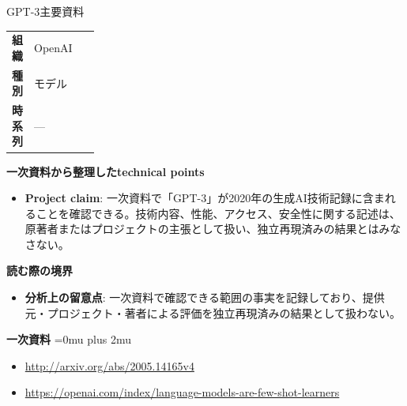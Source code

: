 \begin{technicalnote}{GPT-3}{主要資料}
\begingroup
\begin{tabularx}{\linewidth}{@{}>{\bfseries}p{0.22\linewidth}X@{}}
組織 & OpenAI \\
種別 & モデル \\
時系列 & — \\
\end{tabularx}
\smallskip
{\bfseries 一次資料から整理したtechnical points}
\begin{itemize}[leftmargin=1.5em,itemsep=0.35em]
\item \textbf{Project claim}: 一次資料で「GPT-3」が2020年の生成AI技術記録に含まれることを確認できる。技術内容、性能、アクセス、安全性に関する記述は、原著者またはプロジェクトの主張として扱い、独立再現済みの結果とはみなさない。
\end{itemize}
\begin{minipage}{\linewidth}
{\bfseries 読む際の境界}
\begin{itemize}[leftmargin=1.5em,itemsep=0.35em]
\item \textbf{分析上の留意点}: 一次資料で確認できる範囲の事実を記録しており、提供元・プロジェクト・著者による評価を独立再現済みの結果として扱わない。
\end{itemize}
\begin{samepage}
{\bfseries 一次資料}
\begingroup\sloppy
\Urlmuskip=0mu plus 2mu\relax
\begin{itemize}[leftmargin=1.5em,itemsep=0.25em]
\item {\scriptsize\url{http://arxiv.org/abs/2005.14165v4}}
\item {\scriptsize\url{https://openai.com/index/language-models-are-few-shot-learners}}
\end{itemize}
\endgroup
\end{samepage}
\end{minipage}
\endgroup
\end{technicalnote}
\medskip
